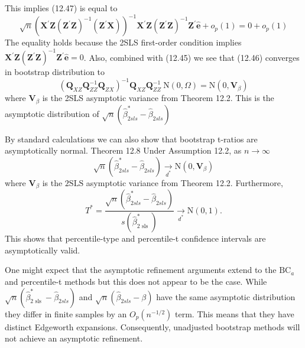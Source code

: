 \documentclass[10pt]{article}
\begin{document}
This implies (12.47) is equal to
$$
\sqrt{n}\left(\boldsymbol{X}^{\prime} \boldsymbol{Z}\left(\boldsymbol{Z}^{\prime} \boldsymbol{Z}\right)^{-1}\left(\boldsymbol{Z}^{\prime} \boldsymbol{X}\right)\right)^{-1} \boldsymbol{X}^{\prime} \boldsymbol{Z}\left(\boldsymbol{Z}^{\prime} \boldsymbol{Z}\right)^{-1} \boldsymbol{Z}^{\prime} \widehat{\boldsymbol{e}}+o_{p}(1)=0+o_{p}(1)
$$
The equality holds because the 2SLS first-order condition implies $\boldsymbol{X}^{\prime} \boldsymbol{Z}\left(\boldsymbol{Z}^{\prime} \boldsymbol{Z}\right)^{-1} \boldsymbol{Z}^{\prime} \widehat{\boldsymbol{e}}=0$. Also, combined with (12.45) we see that (12.46) converges in bootstrap distribution to
$$
\left(\boldsymbol{Q}_{X Z} \boldsymbol{Q}_{Z Z}^{-1} \boldsymbol{Q}_{Z X}\right)^{-1} \boldsymbol{Q}_{X Z} \boldsymbol{Q}_{Z Z}^{-1} \mathrm{~N}(0, \Omega)=\mathrm{N}\left(0, \boldsymbol{V}_{\beta}\right)
$$
where $\boldsymbol{V}_{\beta}$ is the 2SLS asymptotic variance from Theorem 12.2. This is the asymptotic distribution of $\sqrt{n}\left(\widehat{\beta}_{2 s l s}^{*}-\widehat{\beta}_{2 s l s}\right)$

By standard calculations we can also show that bootstrap t-ratios are asymptotically normal. Theorem 12.8 Under Assumption 12.2, as $n \rightarrow \infty$
$$
\sqrt{n}\left(\widehat{\beta}_{2 s l s}^{*}-\widehat{\beta}_{2 s l s}\right) \underset{d^{*}}{\longrightarrow} \mathrm{N}\left(0, \boldsymbol{V}_{\beta}\right)
$$
where $\boldsymbol{V}_{\beta}$ is the $2 \mathrm{SLS}$ asymptotic variance from Theorem 12.2. Furthermore,
$$
T^{*}=\frac{\sqrt{n}\left(\widehat{\beta}_{2 s l s}^{*}-\widehat{\beta}_{2 s l s}\right)}{s\left(\widehat{\beta}_{2 \text { sls }}^{*}\right)} \underset{d^{*}}{\longrightarrow} \mathrm{N}(0,1) .
$$
This shows that percentile-type and percentile-t confidence intervals are asymptotically valid.

One might expect that the asymptotic refinement arguments extend to the $\mathrm{BC}_{a}$ and percentile-t methods but this does not appear to be the case. While $\sqrt{n}\left(\widehat{\beta}_{2 \text { sls }}^{*}-\widehat{\beta}_{2 s l s}\right)$ and $\sqrt{n}\left(\widehat{\beta}_{2 s l s}-\beta\right)$ have the same asymptotic distribution they differ in finite samples by an $O_{p}\left(n^{-1 / 2}\right)$ term. This means that they have distinct Edgeworth expansions. Consequently, unadjusted bootstrap methods will not achieve an asymptotic refinement.
\end{document}
